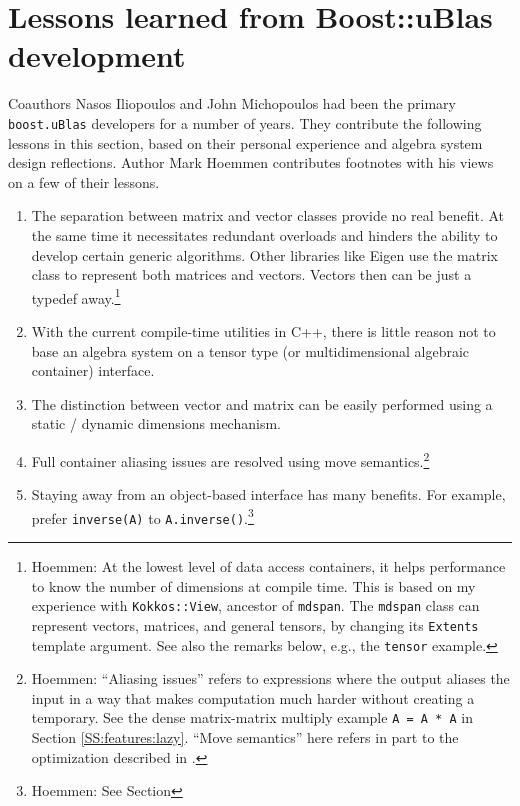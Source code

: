 \section{Lessons learned from Boost::uBlas development}
\label{S:uBlas}

Coauthors Nasos Iliopoulos and John Michopoulos had been the primary
\texttt{boost.uBlas} developers for a number of years. They contribute
the following lessons in this section, based on their personal
experience and algebra system design reflections.  Author Mark Hoemmen
contributes footnotes with his views on a few of their lessons.

\begin{enumerate}
\item The separation between matrix and vector classes provide no real
  benefit. At the same time it necessitates redundant overloads and
  hinders the ability to develop certain generic algorithms. Other
  libraries like Eigen use the matrix class to represent both matrices
  and vectors. Vectors then can be just a typedef
  away.\footnote{Hoemmen: At the lowest level of data access
    containers, it helps performance to know the number of dimensions
    at compile time.  This is based on my experience with
    \texttt{Kokkos::View}, ancestor of \texttt{mdspan}.  The
    \texttt{mdspan} class can represent vectors, matrices, and general
    tensors, by changing its \texttt{Extents} template argument.  See
    also the remarks below, e.g., the \texttt{tensor} example.}
\item With the current compile-time utilities in C++, there is little
  reason not to base an algebra system on a tensor type (or
  multidimensional algebraic container) interface.
\item The distinction between vector and matrix can be easily
  performed using a static / dynamic dimensions mechanism.
\item Full container aliasing issues are resolved using move
  semantics.\footnote{Hoemmen: ``Aliasing issues'' refers to
    expressions where the output aliases the input in a way that makes
    computation much harder without creating a temporary.  See the
    dense matrix-matrix multiply example \texttt{A = A * A} in Section
    \ref{SS:features:lazy}.  ``Move semantics'' here refers in part to
    the optimization described in \cite{ropert2019copy}.}
\item Staying away from an object-based interface has many benefits.
  For example, prefer \texttt{inverse(A)} to
  \texttt{A.inverse()}.\footnote{Hoemmen: See Section
}
\end{enumerate}
